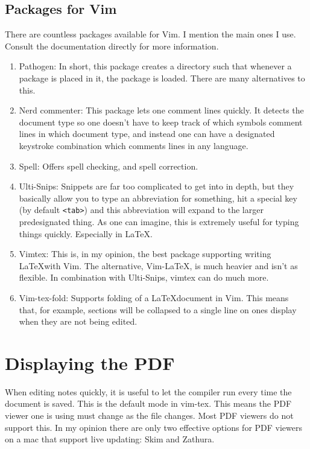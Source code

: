 \documentclass{amsart}
\begin{document}
\subsection{Packages for Vim}

There are countless packages available for Vim. I mention the main ones I use. Consult the
documentation directly for more information.
\begin{enumerate}
\item Pathogen: In short, this package creates a directory such that whenever a package is
placed in it, the package is loaded. There are many alternatives to this. 
\item Nerd commenter: This package lets one comment lines quickly. It detects the document
type so one doesn't have to keep track of which symbols comment lines in which document
type, and instead one can have a designated keystroke combination which comments lines in
any language. 
\item Spell: Offers spell checking, and spell correction.
\item Ulti-Snips: Snippets are far too complicated to get into in depth, but they
basically allow you to type an abbreviation for something, hit a special key (by default
\texttt{<tab>}) and this abbreviation will expand to the larger predesignated thing. As
one can imagine, this is extremely useful for typing things quickly. Especially in \LaTeX.
\item Vimtex: This is, in my opinion, the best package supporting writing \LaTeX with Vim.
The alternative, Vim-LaTeX, is much heavier and isn't as flexible. In combination with
Ulti-Snips, vimtex can do much more. 
\item Vim-tex-fold: Supports folding of a \LaTeX document in Vim. This means that, for
example, sections will be collapsed to a single line on ones display when they are not
being edited. 
\end{enumerate}

\section{Displaying the PDF}

When editing notes quickly, it is useful to let the compiler run every time the document
is saved. This is the default mode in vim-tex. This means the PDF viewer one is using must
change as the file changes. Most PDF viewers do not support this. 
In my opinion there are only two effective options for PDF viewers on a mac that support
live updating: Skim and Zathura.
\end{document}
